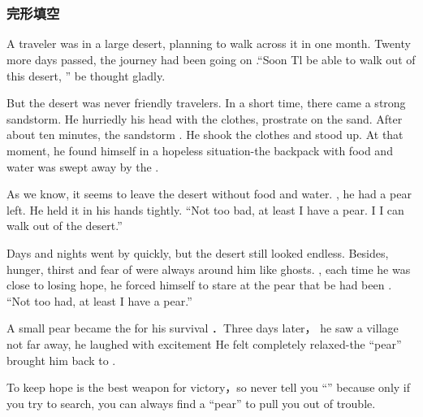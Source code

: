 \documentclass{ExamJHSEngl}
\begin{document}
\chapter[2023]{
  \hspace*{-0.3em}
}


\section{}

\setcounter{subsection}{1}
\subsection{完形填空}

\setcounter{enumi}{21}
\countercontinue

A traveler was in a large desert, planning to walk across it in one month. Twenty more days passed, the journey had been going on \cloze .“Soon Tl be able to walk out of this desert, ” be thought gladly.

But the desert was never friendly \cloze travelers. In a short time, there came a strong sandstorm. He hurriedly \cloze his head with the clothes, prostrate on the sand. After about ten minutes, the sandstorm \cloze . He shook the clothes and stood up. At that moment, he found himself in a hopeless situation-the backpack with food and water was swept away by the \cloze .

As we know, it seems \cloze to leave the desert without food and water. \cloze , he had a pear left. He held it in his hands tightly. “Not too bad, at least I have a pear. I \cloze I can walk out of the desert.”

Days and nights went by quickly, but the desert still looked endless. Besides, hunger, thirst and fear of \cloze were always around him like ghosts. \cloze , each time he was close to losing hope, he forced himself to stare at the pear that be had been  \cloze . “Not too had, at least I have a pear.”

A small pear became the \cloze for his survival  ．Three days later， \cloze he saw a village not far away, he laughed with excitement He felt completely relaxed-the “pear” brought him back to \cloze .

To keep hope is the best weapon  for victory，so never tell you “\cloze” because only if you try to search, you can always find a “pear” to pull you out of trouble.
\end{document}
